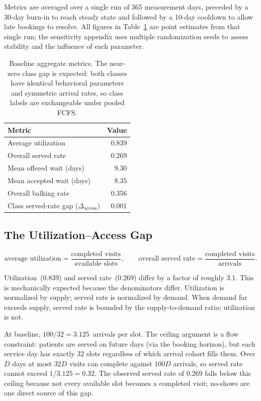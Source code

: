 \documentclass[11pt]{article}
\begin{document}
Metrics are averaged over a single run of 365 measurement days,
preceded by a 30-day burn-in to reach steady state and followed by a
10-day cooldown to allow late bookings to resolve. All figures in
Table~\ref{tab:baseline} are point estimates from that single run; the
sensitivity appendix uses multiple randomization seeds to assess stability and the influence of each parameter.

\begin{table}[H]
\centering
\renewcommand{\arraystretch}{1.15}
\begin{tabular}{lr}
\toprule
Metric & Value \\
\midrule
Average utilization & 0.839 \\
Overall served rate & 0.269 \\
Mean offered wait (days) & 9.30 \\
Mean accepted wait (days) & 8.35 \\
Overall balking rate & 0.356 \\
Class served-rate gap ($\Delta_{\text{access}}$) & 0.001 \\
\bottomrule
\end{tabular}
\caption{Baseline aggregate metrics. The near-zero class gap is expected:
both classes have identical behavioral parameters and symmetric arrival rates,
so class labels are exchangeable under pooled FCFS.}
\label{tab:baseline}
\end{table}

\subsection{The Utilization--Access Gap}

\[
  \text{average utilization}
  = \frac{\text{completed visits}}{\text{available slots}},
  \qquad
  \text{overall served rate}
  = \frac{\text{completed visits}}{\text{arrivals}}.
\]

Utilization~(0.839) and served rate~(0.269) differ by a factor of roughly
3.1. This is mechanically expected because the denominators differ.
Utilization is normalized by supply; served rate is normalized by demand.
When demand far exceeds supply, served rate is bounded by the
supply-to-demand ratio; utilization is not.

At baseline, $100/32 = 3.125$~arrivals per slot. The ceiling argument is
a flow constraint: patients are served on future days (via the booking
horizon), but each service day has exactly 32 slots regardless of which
arrival cohort fills them. Over $D$ days at most $32D$ visits can complete
against $100D$ arrivals, so served rate cannot exceed $1/3.125 = 0.32$.
The observed served rate of 0.269 falls below this ceiling because
not every available slot becomes a completed visit; no-shows are one direct
source of this gap.
\end{document}
